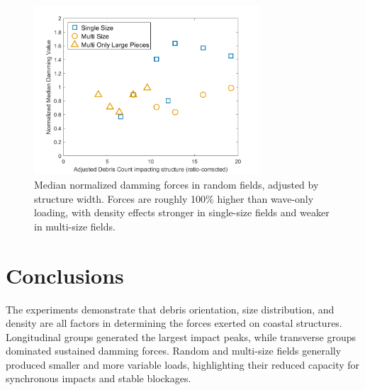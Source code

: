 \documentclass{article}
\begin{document}
\begin{figure}[htbp]
    \centering
    \includegraphics[width=0.75\textwidth]{Damming_Median_Single_vs_Multi_Adjusted.png}
    \caption{Median normalized damming forces in random fields, adjusted by structure width. Forces are roughly 100\% higher than wave-only loading, with density effects stronger in single-size fields and weaker in multi-size fields.}
    \label{fig:random_damming_median_adjusted}
\end{figure}


\section{Conclusions} The experiments demonstrate that debris orientation, size distribution, and density are all factors in determining the forces exerted on coastal structures. Longitudinal groups generated the largest impact peaks, while transverse groups dominated sustained damming forces. Random and multi-size fields generally produced smaller and more variable loads, highlighting their reduced capacity for synchronous impacts and stable blockages. 
\end{document}
